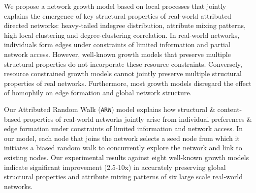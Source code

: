 
We propose a network growth model based on local processes that jointly explains the
emergence of key structural properties of real-world attributed directed networks:
heavy-tailed indegree distribution, attribute mixing patterns, high local
clustering and degree-clustering correlation.
In real-world networks, individuals form edges
under constraints of limited information and partial network access. However,
well-known growth models that preserve multiple structural properties do not
incorporate these resource constraints. Conversely, resource constrained growth models
cannot jointly preserve multiple structural
properties of real networks. Furthermore, most growth models disregard
the effect of homophily on edge formation and global network structure.

Our Attributed Random Walk (\texttt{ARW}) model explains how structural \&
content-based properties of real-world networks jointly arise from individual
preferences \& edge formation under constraints of limited information and network access.
In our model, each node that joins the network selects a seed node from which it initiates a
biased random walk to concurrently explore the network and link to existing nodes.
Our experimental results against eight well-known growth models
indicate significant improvement (2.5-10x) in accurately preserving global
structural properties and attribute mixing patterns of
six large scale real-world networks.